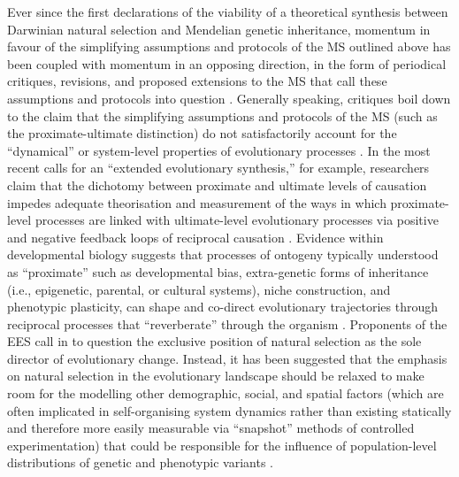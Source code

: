 Ever since the first declarations of the viability of a theoretical synthesis between Darwinian natural selection and Mendelian genetic inheritance, momentum in favour of the simplifying assumptions and protocols of the MS outlined above has been coupled with momentum in an opposing direction, in the form of periodical critiques, revisions, and proposed extensions to the MS that call these assumptions and protocols into question \citep[see, for example][]{Waddington1950,Gould1980,Levins1985,Ingold1990,Ingold1995,Odling-Schmee2003,Piggliuci2007}. Generally speaking, critiques boil down to the claim that the simplifying assumptions and protocols of the MS (such as the proximate-ultimate distinction) do not satisfactorily account for the ``dynamical'' or system-level properties of evolutionary processes \citep{Laland2011}. In the most recent calls for an ``extended evolutionary synthesis,'' \citep[EES, see][]{Pigliucci2007} for example, researchers claim that the dichotomy between proximate and ultimate levels of causation impedes adequate theorisation and measurement of the ways in which proximate-level processes are linked with ultimate-level evolutionary processes via positive and negative feedback loops of reciprocal causation \citep{Pigliucci2007,Laland2011,Laland2013,Mesoudi2013,Laland2015}. Evidence within developmental biology suggests that processes of ontogeny typically understood as ``proximate'' such as developmental bias, extra-genetic forms of inheritance (i.e., epigenetic, parental, or cultural systems), niche construction, and phenotypic plasticity, can shape and co-direct evolutionary trajectories through reciprocal processes that ``reverberate'' through the organism \citep{Laland2013}.  Proponents of the EES call in to question the exclusive position of natural selection as the sole director of evolutionary change.  Instead, it has been suggested that the emphasis on natural selection in the evolutionary landscape should be relaxed to make room for the modelling other demographic, social, and spatial factors (which are often implicated in self-organising system dynamics rather than existing statically and therefore more easily measurable via ``snapshot'' methods of controlled experimentation) that could be responsible for the influence of population-level distributions of genetic and phenotypic variants \citep{Mesoudi2013}.

